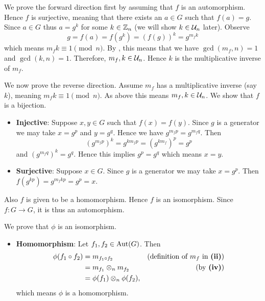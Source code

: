 \begin{questions}
\begin{partquestions}{\roman*}
        \item We prove the forward direction first by assuming that $f$ is an automorphism. Hence $f$ is surjective, meaning that there exists an $a \in G$ such that $f(a) = g$. Since $a \in G$ thus $a = g^k$ for some $k \in \mathbb{Z}_n$ (we will show $k \in \mathcal{U}_{n}$ later). Observe
        \[
            g = f(a) = f(g^k) = (f(g))^k = g^{m_fk}        
        \]
        which means $m_fk \equiv 1 \pmod n$. By , this means that we have $\gcd(m_f, n) = 1$ and $\gcd(k, n) = 1$. Therefore, $m_f, k \in \mathcal{U}_{n}$. Hence $k$ is the multiplicative inverse of $m_f$.
        
        We now prove the reverse direction. Assume $m_f$ has a multiplicative inverse (say $k$), meaning $m_fk \equiv 1 \pmod n$. As above this means $m_f, k \in \mathcal{U}_{n}$. We show that $f$ is a bijection.
        \begin{itemize}
            \item \textbf{Injective}: Suppose $x, y \in G$ such that $f(x) = f(y)$. Since $g$ is a generator we may take $x = g^p$ and $y = g^q$. Hence we have $g^{m_fp} = g^{m_fq}$. Then
            \[
                \left(g^{m_fp}\right)^k = g^{km_fp} = \left(g^{km_f}\right)^p = g^p            
            \]
            and $\left(g^{m_fq}\right)^k = g^q$. Hence this implies $g^p = g^q$ which means $x = y$.
            \item \textbf{Surjective}: Suppose $x \in G$. Since $g$ is a generator we may take $x = g^p$. Then $f(g^{kp}) = g^{m_fkp} = g^p = x$.
        \end{itemize}
        Also $f$ is given to be a homomorphism. Hence $f$ is an isomorphism. Since $f: G \to G$, it is thus an automorphism.
        
        \item We prove that $\phi$ is an isomorphism.
        \begin{itemize}
            \item \textbf{Homomorphism}: Let $f_1, f_2 \in \mathrm{Aut}(G)$. Then
            \begin{align*}
                \phi(f_1\circ f_2) &= m_{f_1\circ f_2} & (\text{definition of } m_f \text{ in }\textbf{(ii)})\\
                &= m_{f_1} \otimes_n m_{f_2} & (\text{by \textbf{(iv)}})\\
                &= \phi(f_1)\otimes_n\phi(f_2),
            \end{align*}
            which means $\phi$ is a homomorphism.


\end{itemize}
\end{partquestions}
\end{questions}
